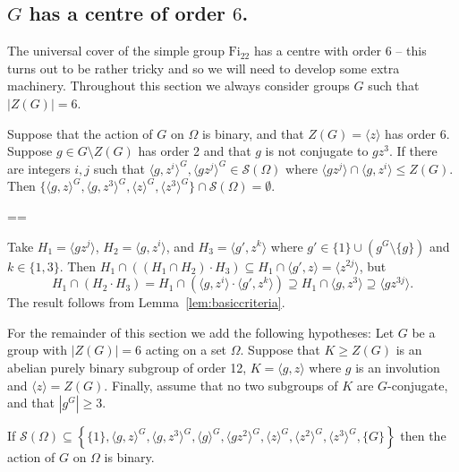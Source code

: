 \documentclass[11pt, a4paper]{amsart}
\makeatletter
\renewcommand{\proofname}{Proof}
\renewenvironment{proof}[1][\proofname]{\par
  \pushQED{\qed}  \normalfont \partopsep=\z@skip \topsep=\z@skip
  \trivlist
  \item[\hskip\labelsep
        \scshape
    #1\@addpunct{.}]\ignorespaces
}{  \popQED\endtrivlist\@endpefalse
}
\makeatother
\begin{document}
\subsection{$G$ has a centre of order $6$.}

The universal cover of the simple group $\mathrm{Fi}_{22}$ has a centre with order $6$ -- this turns out to be rather tricky and so we will need to develop some extra machinery. Throughout this section we always consider groups $G$ such that $|Z(G)|=6$.

\begin{lemma}\label{lem:cent6forbidden}
    Suppose that the action of $G$ on $\Omega$ is binary, and that $Z(G)=\langle z\rangle$ has order 6. Suppose $g\in G\setminus Z(G)$ has order 2 and that $g$ is not conjugate to $gz^3$. If there are integers $i,j$ such that $\langle g,z^i\rangle^G,\langle gz^j\rangle^G\in\mathcal{S}(\Omega)$ where $\langle gz^{j}\rangle\cap\langle g,z^i\rangle\leq Z(G)$. Then $\{\langle g,z\rangle^G,\langle g,z^3\rangle^G,\langle z\rangle^G ,\langle z^3\rangle^G\}\cap \mathcal{S}(\Omega)=\emptyset$.\end{lemma}
\begin{proof}
    
    Take $H_1=\langle gz^j\rangle$, $H_2=\langle g,z^i\rangle$, and $H_3=\langle g',z^k\rangle$ where $g'\in \{1\}\cup \left(g^G\setminus\{g\}\right)$ and $k\in \{1,3\}$. Then $H_1\cap((H_1\cap H_2)\cdot H_3)\subseteq H_1\cap \langle g',z\rangle=\langle z^{2j}\rangle$, but $$H_1\cap(H_2\cdot H_3)=H_1\cap(\langle g,z^i\rangle\cdot \langle g',z^k\rangle)\supseteq H_1\cap\langle g,z^3\rangle\supseteq\langle gz^{3j}\rangle.$$ The result follows from Lemma~\ref{lem:basiccriteria}.
\end{proof}

For the remainder of this section we add the following hypotheses: Let $G$ be a group with $|Z(G)|=6$ acting on a set $\Omega$. Suppose that $K\geq Z(G)$ is an abelian purely binary subgroup of order 12, $K=\langle g,z\rangle$ where $g$ is an involution and $\langle z\rangle=Z(G)$. Finally, assume that no two subgroups of $K$ are $G$-conjugate, and that $|g^G|\geq 3$. 

\begin{lemma}\label{lem:nogzi}
If $\mathcal{S}(\Omega)\subseteq\left\{\{1\},\langle g,z\rangle^G,\langle g,z^3\rangle^G,\langle g\rangle^G,\langle gz^2\rangle^G,\langle z\rangle^G,\langle z^2\rangle^G,\langle z^3\rangle^G,\{G\}\right\}$ then the action of $G$ on $\Omega$ is binary.
\end{lemma}
\end{document}
